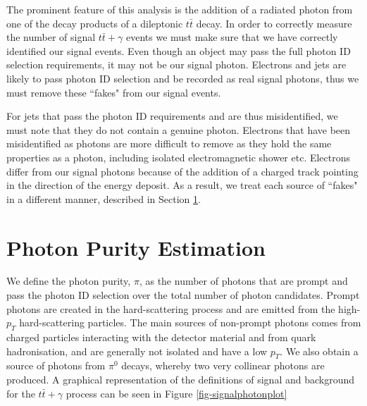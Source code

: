 The prominent feature of this analysis is the addition of a radiated photon from one of the decay products of a dileptonic $t\bar{t}$ decay. In order to correctly measure the number of signal $t\bar{t}+\gamma$ events we must make sure that we have correctly identified our signal events. Even though an object may pass the full photon ID selection requirements, it may not be our signal photon. Electrons and jets are likely to pass photon ID selection and be recorded as real signal photons, thus we must remove these ``fakes" from our signal events.

For jets that pass the photon ID requirements and are thus misidentified, we must note that they do not contain a genuine photon. Electrons that have been misidentified as photons are more difficult to remove as they hold the same properties as a photon, including isolated electromagnetic shower etc. Electrons differ from our signal photons because of the addition of a charged track pointing in the direction of the energy deposit. As a result, we treat each source of ``fakes" in a different manner, described in Section \ref{sec-PhotonPurityEstimation}.





\section{Photon Purity Estimation} \label{sec-PhotonPurityEstimation}

We define the photon purity, $\pi$, as the number of photons that are prompt and pass the photon ID selection over the total number of photon candidates. Prompt photons are created in the hard-scattering process and are emitted from the high-$p_T$ hard-scattering particles. The main sources of non-prompt photons comes from charged particles interacting with the detector material and from quark hadronisation, and are generally not isolated and have a low $p_T$. We also obtain a source of photons from $\pi^0$ decays, whereby two very collinear photons are produced. A graphical representation of the definitions of signal and background for the $t\bar{t}+\gamma$ process can be seen in Figure \ref{fig-signalphotonplot}

